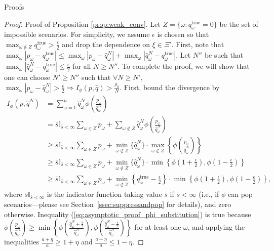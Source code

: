 \documentclass[ijoc,letterpaper]{informs3} %
\newcommand{\qtrue}{q^{\text{true}}}
\begin{document}
\begin{APPENDIX}{Proofs}
\begin{proof}{\sc Proof of Proposition \ref{prop:weak_conv}.}
	Let $Z = \{\omega : \qtrue_\omega = 0\}$ be the set of impossible scenarios.
	For simplicity, we assume $\epsilon$ is chosen so that $\max_{\omega \notin Z} \qtrue_\omega > \frac{\epsilon}{2}$ and drop the dependence on $\xi \in \Xi'$.	
	First, note that $\max_\omega |p_\omega - \qtrue_\omega| \leq \max_\omega |p_\omega - \hat{q}^N_\omega| + \max_\omega |\hat{q}^N_\omega - \qtrue_\omega|$.
	Let $N''$ be such that $\max_\omega |\hat{q}^N_\omega - \qtrue_\omega| \leq \frac{\epsilon}{2}$ for all $N \geq N''$.
	To complete the proof, we will show that one can choose $N' \geq N''$ such that $\forall N \geq N'$, $\max_\omega |p_\omega - \hat{q}^N_\omega| > \frac{\epsilon}{2} \Rightarrow I_\phi(p,\hat{q}) > \frac{\rho_0}{N}$.
	First, bound the divergence by
	\begin{align}
		I_{\phi}(p,\hat{q}^N) & = \sum_{\omega=1}^n \hat{q}^N_\omega \phi\left( \frac{p_\omega}{\hat{q}^N_\omega} \right) \nonumber \\
		& = \bar{s} \mathbb{I}_{\bar{s} < \infty} \sum_{\omega \in Z} p_\omega + \sum_{\omega \notin Z} \hat{q}^N_\omega \phi\left( \frac{p_\omega}{\hat{q}^N_\omega} \right) \nonumber \\
		& \geq \bar{s} \mathbb{I}_{\bar{s} < \infty} \sum_{\omega \in Z} p_\omega + \min_{\omega \notin Z} \{\hat{q}^N_\omega\} \cdot \max_{\omega \notin Z} \left\{ \phi \left( \frac{p_\omega}{\hat{q}^N_\omega} \right) \right\} \nonumber \\
		& \geq \bar{s} \mathbb{I}_{\bar{s} < \infty} \sum_{\omega \in Z} p_\omega  + \min_{\omega \notin Z} \{\hat{q}^N_\omega\} \cdot \min\left\{ \phi\left(1+\frac{\epsilon}{2}\right), \phi\left(1-\frac{\epsilon}{2}\right) \right\} \label{eq:asymptotic_proof_phi_substitution} \\
		& \geq \bar{s} \mathbb{I}_{\bar{s} < \infty} \sum_{\omega \in Z} p_\omega + \min_{\omega \notin Z} \left\{ \qtrue_\omega - \frac{\epsilon}{2} \right\} \cdot \min\left\{ \phi\left(1+\frac{\epsilon}{2}\right), \phi\left(1-\frac{\epsilon}{2}\right) \right\} \nonumber,
	\end{align}
	where $\bar{s}\mathbb{I}_{\bar{s} < \infty}$ is the indicator function taking value $\bar{s}$ if $\bar{s} < \infty$ (i.e., if $\phi$ can pop scenarios---please see Section~\ref{ssec:suppressandpop} for details), and zero otherwise.	
	Inequality (\ref{eq:asymptotic_proof_phi_substitution}) is true because $\phi \left( \frac{p_\omega}{\hat{q}^N_\omega} \right) \geq \min\left\{ \phi\left( \frac{\hat{q}^N_\omega+\tfrac{\epsilon}{2}}{\hat{q}^N_\omega} \right), \phi\left( \frac{\hat{q}^N_\omega-\tfrac{\epsilon}{2}}{\hat{q}^N_\omega} \right) \right\}$ for at least one $\omega$, and applying the inequalities $\frac{a+\eta}{a} \geq 1 + \eta$ and $\frac{a-\eta}{a} \leq 1-\eta$.
	

\end{proof}
\end{APPENDIX}
\end{document}
